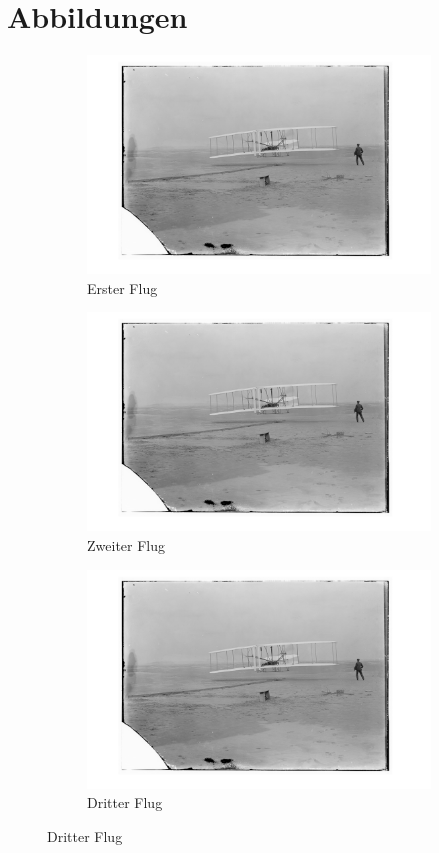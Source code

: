 \documentclass[a4paper]{amsart}
\begin{document}
\section{Abbildungen}

\begin{figure}
    \caption{Kitty Warol}
    \begin{subfigure}[b]{0.3\textwidth}
        \caption{Erster Flug}
        \includegraphics[width=\textwidth]{bild.png}
    \end{subfigure}
    \begin{subfigure}[b]{0.3\textwidth}
        \caption{Zweiter Flug}
        \includegraphics[width=\textwidth]{bild.png}
    \end{subfigure}
    \begin{subfigure}[b]{0.3\textwidth}
        \caption{Dritter Flug}
        \includegraphics[width=\textwidth]{bild.png}

\end{subfigure}
\end{figure}
\end{document}
